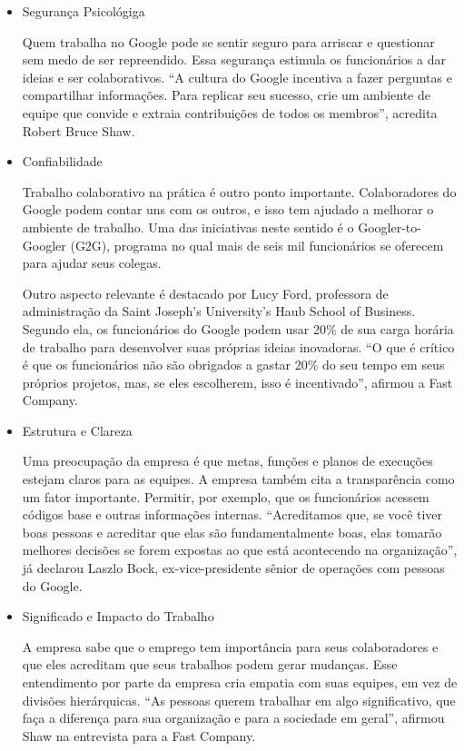 \documentclass[a4paper]{article}
\begin{document}
\begin{itemize}
    \item Segurança Psicológiga
    \par Quem trabalha no Google pode se sentir seguro para arriscar e questionar sem medo de ser repreendido. Essa segurança estimula os funcionários a dar ideias e ser colaborativos.  “A cultura do Google incentiva a fazer perguntas e compartilhar informações. Para replicar seu sucesso, crie um ambiente de equipe que convide e extraia contribuições de todos os membros”, acredita Robert Bruce Shaw.
    
    \item Confiabilidade
    \par Trabalho colaborativo na prática é outro ponto importante. Colaboradores do Google podem contar uns com os outros, e isso tem ajudado a melhorar o ambiente de trabalho. Uma das iniciativas neste sentido é o Googler-to-Googler (G2G), programa no qual mais de seis mil funcionários se oferecem para ajudar seus colegas. 
    \par Outro aspecto relevante é destacado por Lucy Ford, professora de administração da Saint Joseph’s University’s Haub School of Business. Segundo ela, os funcionários do Google podem usar 20\% de sua carga horária de trabalho para desenvolver suas próprias ideias inovadoras. “O que é crítico é que os funcionários não são obrigados a gastar 20\% do seu tempo em seus próprios projetos, mas, se eles escolherem, isso é incentivado”, afirmou a Fast Company.

    \item Estrutura e Clareza
    \par Uma preocupação da empresa é que metas, funções e planos de execuções estejam claros para as equipes.  A empresa também cita a transparência como um fator importante. Permitir, por exemplo, que os funcionários acessem códigos base e outras informações internas. “Acreditamos que, se você tiver boas pessoas e acreditar que elas são fundamentalmente boas, elas tomarão melhores decisões se forem expostas ao que está acontecendo na organização”, já declarou Laszlo Bock, ex-vice-presidente sênior de operações com pessoas do Google.
    
    \item Significado e Impacto do Trabalho
    \par A empresa sabe que o emprego tem importância para seus colaboradores e que eles acreditam que seus trabalhos podem gerar mudanças. Esse entendimento por parte da empresa cria empatia com suas equipes, em vez de divisões hierárquicas. “As pessoas querem trabalhar em algo significativo, que faça a diferença para sua organização e para a sociedade em geral”, afirmou Shaw na entrevista para a Fast Company.
\end{itemize}
\end{document}
